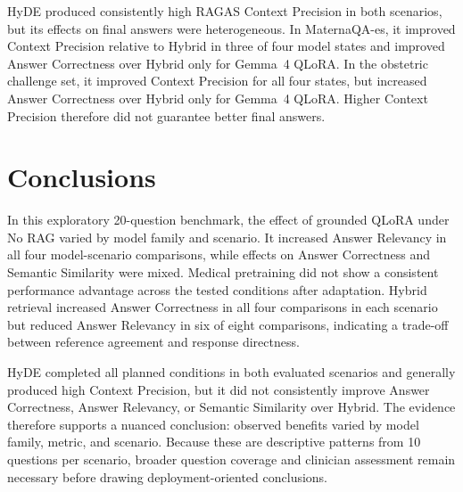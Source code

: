 HyDE produced consistently high RAGAS Context Precision in both scenarios,
but its effects on final answers were heterogeneous. In MaternaQA-es, it
improved Context Precision relative to Hybrid in three of four model states
and improved Answer Correctness over Hybrid only for Gemma~4 QLoRA. In the
obstetric challenge set, it improved Context Precision for all four states,
but increased Answer Correctness over Hybrid only for Gemma~4 QLoRA. Higher
Context Precision therefore did not guarantee better final answers.
\section{Conclusions}
In this exploratory 20-question benchmark, the effect of grounded QLoRA under
No RAG varied by model family and scenario. It increased Answer Relevancy in
all four model-scenario comparisons, while effects on Answer Correctness and
Semantic Similarity were mixed. Medical pretraining did not show a consistent
performance advantage across the tested conditions after adaptation. Hybrid
retrieval increased Answer Correctness in all four comparisons in each
scenario but reduced Answer Relevancy in six of eight comparisons, indicating
a trade-off between reference agreement and response directness.

HyDE completed all planned conditions in both evaluated scenarios and
generally produced high Context Precision, but it did not consistently improve
Answer Correctness, Answer Relevancy, or Semantic Similarity over Hybrid. The
evidence therefore supports a nuanced conclusion: observed benefits varied
by model family, metric, and scenario. Because these are descriptive patterns
from 10 questions per scenario, broader question coverage and clinician
assessment remain necessary before drawing deployment-oriented conclusions.




